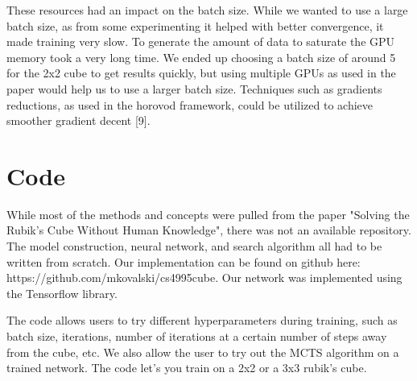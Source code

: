 \documentclass[10pt,twocolumn,letterpaper]{article}
\begin{document}
These resources had an impact on the batch size. While we wanted to use a large batch size, as from some experimenting it helped with better convergence, it made training very slow. To generate the amount of data to saturate the GPU memory took a very long time. We ended up choosing a batch size of around 5 for the 2x2 cube to get results quickly, but using multiple GPUs as used in the paper would help us to use a larger batch size. Techniques such as gradients reductions, as used in the horovod framework, could be utilized to achieve smoother gradient decent [9].




\section{Code}

While most of the methods and concepts were pulled from the paper "Solving the Rubik’s Cube Without Human Knowledge", there was not an available repository.  The model construction, neural network, and search algorithm all had to be written from scratch.  Our implementation can be found on github here: https://github.com/mkovalski/cs4995\textunderscore cube.  Our network was implemented using the Tensorflow library. 

The code allows users to try different hyperparameters during training, such as batch size, iterations, number of iterations at a certain number of steps away from the cube, etc.   We also allow the user to try out the MCTS algorithm on a trained network. The code let's you train on a 2x2 or a 3x3 rubik's cube. 


\end{document}
